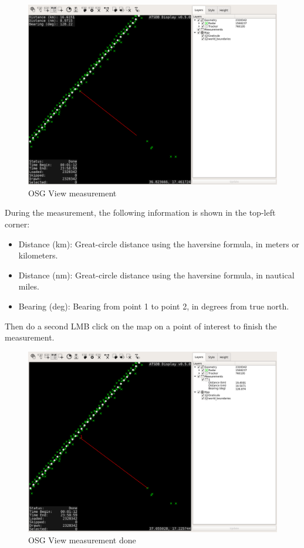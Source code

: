 \begin{figure}[H]
    \hspace*{-2.5cm}
    \includegraphics[width=19cm,frame]{figures/osgview_measure1.png}
  \caption{OSG View measurement}
\end{figure}

During the measurement, the following information is shown in the top-left corner:

\begin{itemize}
 \item Distance (km): Great-circle distance using the haversine formula, in meters or kilometers.
 \item Distance (nm): Great-circle distance using the haversine formula, in nautical miles.
 \item  Bearing (deg): Bearing from point 1 to point 2, in degrees from true north.
\end{itemize}

Then do a second LMB click on the map on a point of interest to finish the measurement.

\begin{figure}[H]
    \hspace*{-2.5cm}
    \includegraphics[width=19cm,frame]{figures/osgview_measure2.png}
  \caption{OSG View measurement done}
\end{figure}

